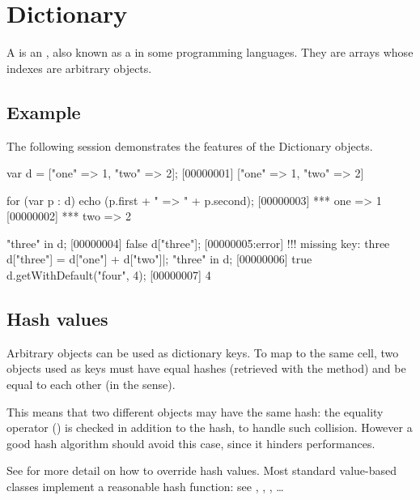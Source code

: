 
\section{Dictionary}

A  is an , also known as a 
in some programming languages.  They are arrays whose indexes are arbitrary
objects.

\subsection{Example}

The following session demonstrates the features of the Dictionary objects.

\begin{urbiscript}[firstnumber=1]
var d = ["one" => 1, "two" => 2];
[00000001] ["one" => 1, "two" => 2]

for (var p : d)
  echo (p.first + " => " + p.second);
[00000003] *** one => 1
[00000002] *** two => 2

"three" in d;
[00000004] false
d["three"];
[00000005:error] !!! missing key: three
d["three"] = d["one"] + d["two"]|;
"three" in d;
[00000006] true
d.getWithDefault("four", 4);
[00000007] 4
\end{urbiscript}

\subsection{Hash values}
\label{sec:dictionary:hash}

Arbitrary objects can be used as dictionary keys. To map to the same cell,
two objects used as keys must have equal hashes (retrieved with the
 method) and be equal to each other (in the
 sense).

This means that two different objects may have the same hash: the equality
operator () is checked in addition to the hash, to
handle such collision.  However a good hash algorithm should avoid this
case, since it hinders performances.

See  for more detail on how to override hash
values. Most standard value-based classes implement a reasonable hash
function: see , ,
, \ldots

